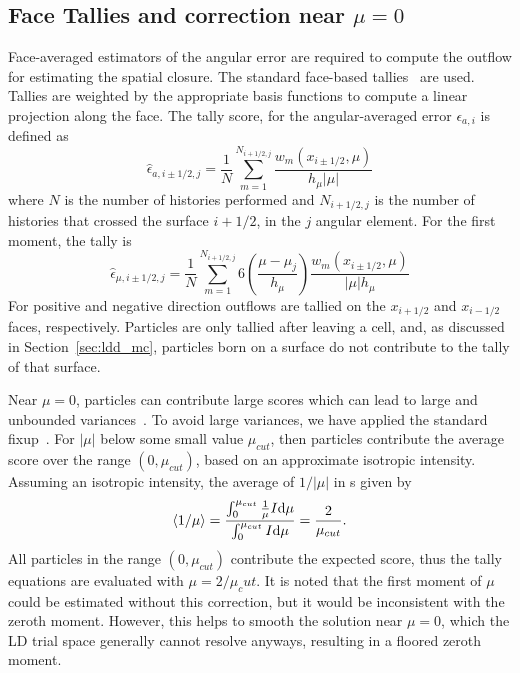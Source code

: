 \subsection{Face Tallies and correction near $\mu=0$}
\label{sec:face_tallies}

Face-averaged estimators of the angular error are required to compute the outflow for
estimating the spatial closure. The standard face-based
tallies~\cite{shultis_mc,favorite_faces} are used.  Tallies are weighted by
the appropriate basis functions to compute a linear projection along the face.  The
tally score, for the angular-averaged error $\epsilon_{a,i}$ is defined as
\begin{equation}
    \hat \epsilon_{a,i\pm1/2,j} = \frac{1}{N} \sum_{m=1}^{N_{i+1/2,j}}
    \frac{w_m(x_{i\pm1/2},\mu)}{h_{\mu} |\mu|}
\end{equation}
where $N$ is the number of histories performed and $N_{i+1/2,j}$ is the number of histories
that crossed the surface $i+1/2$, in the $j$ angular element.   For the first
moment, the tally is
\begin{equation}
    \hat \epsilon_{\mu,i\pm1/2,j} = \frac{1}{N} \sum_{m=1}^{N_{i+1/2,j}} 
    6\left(\frac{\mu-\mu_j}{h_\mu}\right) \frac{w_m(x_{i\pm1/2},\mu)}{|\mu| h_{\mu}}
\end{equation}
For positive and negative direction outflows are tallied
on the $x_{i+1/2}$ and $x_{i-1/2}$ faces, respectively. Particles are only tallied after leaving
a cell, and, as discussed in Section~\ref{sec:ldd_mc}, particles born on a surface do not contribute
to the tally of that surface.

Near $\mu=0$, particles can contribute large scores which can lead to large and
unbounded variances~\cite{favorite_faces}.  To avoid large variances, we have applied the standard fixup~\cite{mcnp,favorite_faces}.  
For $|\mu|$ below some small value $\mu_{cut}$, then 
particles contribute the average score over the range $(0,\mu_{cut})$, based on an
approximate isotropic intensity.  Assuming an isotropic intensity, the average of
$1/|\mu|$ in s given by
\begin{equation}
    \langle 1/\mu \rangle = \frac{\int_0^{\mu_{cut}}\frac{1}{\mu} I \mathrm{d} \mu}{\int_0^{\mu_{cut}} I \mathrm{d} \mu} =
    \frac{2}{\mu_{cut}}.
\end{equation}
All particles in the range $(0,\mu_{cut})$ contribute the expected score, thus the tally
equations are evaluated with $\mu = 2/\mu_cut$.  It is noted that the first moment of $\mu$
could be estimated without this correction, but it would be inconsistent with the zeroth
moment.  However, this helps to smooth the solution near $\mu=0$, which the LD trial space
generally cannot resolve anyways, resulting in a floored zeroth moment.


